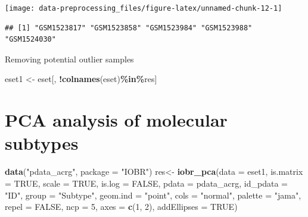 \documentclass[
  12pt,
]{book}
\newenvironment{Shaded}{\begin{snugshade}}{\end{snugshade}}
\newcommand{\AttributeTok}[1]{\textcolor[rgb]{0.13,0.29,0.53}{#1}}
\newcommand{\ConstantTok}[1]{\textcolor[rgb]{0.56,0.35,0.01}{#1}}
\newcommand{\DecValTok}[1]{\textcolor[rgb]{0.00,0.00,0.81}{#1}}
\newcommand{\FunctionTok}[1]{\textcolor[rgb]{0.13,0.29,0.53}{\textbf{#1}}}
\newcommand{\NormalTok}[1]{#1}
\newcommand{\OtherTok}[1]{\textcolor[rgb]{0.56,0.35,0.01}{#1}}
\newcommand{\SpecialCharTok}[1]{\textcolor[rgb]{0.81,0.36,0.00}{\textbf{#1}}}
\newcommand{\StringTok}[1]{\textcolor[rgb]{0.31,0.60,0.02}{#1}}
\begin{document}
\begin{center}\texttt{[image: data-preprocessing\_files/figure-latex/unnamed-chunk-12-1]} \end{center}

\begin{verbatim}
## [1] "GSM1523817" "GSM1523858" "GSM1523984" "GSM1523988" "GSM1524030"
\end{verbatim}

Removing potential outlier samples

\begin{Shaded}
\begin{Highlighting}[]
\NormalTok{eset1 }\OtherTok{\textless{}{-}}\NormalTok{ eset[, }\SpecialCharTok{!}\FunctionTok{colnames}\NormalTok{(eset)}\SpecialCharTok{\%in\%}\NormalTok{res]}
\end{Highlighting}
\end{Shaded}

\hypertarget{pca-analysis-of-molecular-subtypes}{%
\section{PCA analysis of molecular subtypes}\label{pca-analysis-of-molecular-subtypes}}

\begin{Shaded}
\begin{Highlighting}[]
\FunctionTok{data}\NormalTok{(}\StringTok{"pdata\_acrg"}\NormalTok{, }\AttributeTok{package =} \StringTok{"IOBR"}\NormalTok{)}
\NormalTok{res}\OtherTok{\textless{}{-}} \FunctionTok{iobr\_pca}\NormalTok{(}\AttributeTok{data       =}\NormalTok{ eset1,}
              \AttributeTok{is.matrix   =} \ConstantTok{TRUE}\NormalTok{,}
              \AttributeTok{scale       =} \ConstantTok{TRUE}\NormalTok{,}
              \AttributeTok{is.log      =} \ConstantTok{FALSE}\NormalTok{,}
              \AttributeTok{pdata       =}\NormalTok{ pdata\_acrg, }
              \AttributeTok{id\_pdata    =} \StringTok{"ID"}\NormalTok{, }
              \AttributeTok{group       =} \StringTok{"Subtype"}\NormalTok{,}
              \AttributeTok{geom.ind    =} \StringTok{"point"}\NormalTok{, }
              \AttributeTok{cols        =} \StringTok{"normal"}\NormalTok{,}
              \AttributeTok{palette     =} \StringTok{"jama"}\NormalTok{, }
              \AttributeTok{repel       =} \ConstantTok{FALSE}\NormalTok{,}
              \AttributeTok{ncp         =} \DecValTok{5}\NormalTok{,}
              \AttributeTok{axes        =} \FunctionTok{c}\NormalTok{(}\DecValTok{1}\NormalTok{, }\DecValTok{2}\NormalTok{),}
              \AttributeTok{addEllipses =} \ConstantTok{TRUE}\NormalTok{)}
\end{Highlighting}
\end{Shaded}
\end{document}

